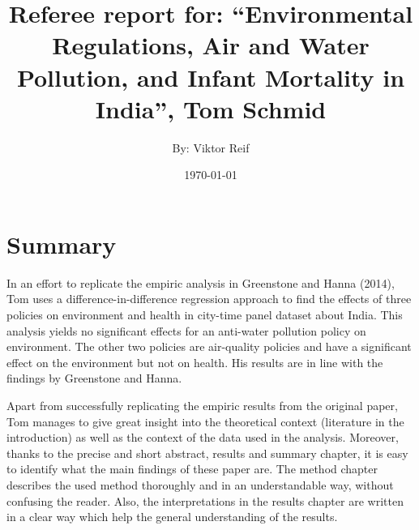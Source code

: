 \documentclass[11pt]{article}
\title{Referee report for: “Environmental Regulations, Air and Water
	Pollution, and Infant Mortality in India”, Tom Schmid}
\author{By: Viktor Reif}
\date{\today}
\begin{document}
	\maketitle
	
	


\section{Summary}
In an effort to replicate the empiric analysis in Greenstone and Hanna (2014), Tom uses a difference-in-difference regression approach to find the effects of three policies on environment and health in city-time panel dataset about India. This analysis yields no significant effects for an anti-water pollution policy on environment. The other two policies are air-quality policies and have a significant effect on the environment but not on health. His results are in line with the findings by Greenstone and Hanna.

Apart from successfully replicating the empiric results from the original paper, Tom manages to give great insight into the theoretical context (literature in the introduction) as well as the context of the data used in the analysis.  
Moreover, thanks to the precise and short abstract, results and summary chapter, it is easy to identify what the main findings of these paper are. 
The method chapter describes the used method thoroughly and in an understandable way, without confusing the reader. 
Also, the interpretations in the results chapter are written in a clear way which help the general understanding of the results. 
\end{document}
